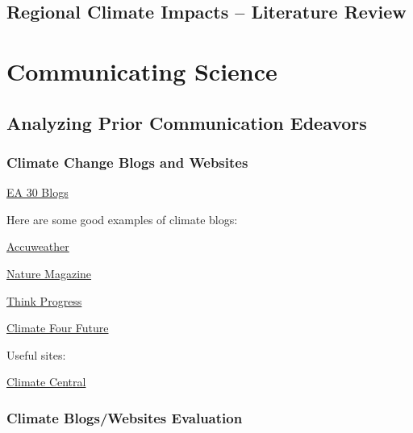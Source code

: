 \documentclass{article}\usepackage[]{graphicx}\usepackage[]{color}
\newenvironment{itemize*}%
  {\begin{itemize}%
    \setlength{\itemsep}{0pt}%
    \setlength{\parskip}{0pt}}%
  {\end{itemize}}
\begin{document}


\subsection{Regional Climate Impacts -- Literature Review}



\section{Communicating Science}

\subsection{Analyzing Prior Communication Edeavors}

\subsubsection{Climate Change Blogs and Websites}

\href{https://marclos.github.io/Climate_Change_Narratives/}{EA 30 Blogs}

Here are some good examples of climate blogs:

\begin{itemize*}
  \item \href{http://www.accuweather.com/en/weather-blogs/climatechange}{Accuweather}
  \item \href{http://blogs.nature.com/climatefeedback/}{Nature Magazine}
  \item \href{https://thinkprogress.org/tagged/climate}{Think Progress}
  \item \href{http://climateofourfuture.org/}{Climate Four Future}
\end{itemize*}

Useful sites: 

\begin{itemize*}
  \item \href{http://www.climatecentral.org/news/the-heat-is-on}{Climate Central}
  \item 
\end{itemize*}

\subsubsection{Climate Blogs/Websites Evaluation}
\end{document}
